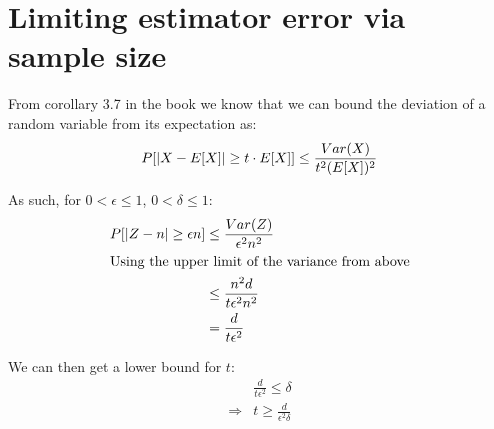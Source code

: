 \documentclass[a4paper]{scrreprt}
\DeclarePairedDelimiter\abs{\lvert}{\rvert}
\begin{document}
\section{Limiting estimator error via sample size}

From corollary 3.7 in the book we know that we can bound the deviation of a
random variable from its expectation as:
\[
	P[\abs{X - E[X]} \geq t \cdot E[X]] \leq \frac{Var(X)}{t^2 (E[X])^2}
\]

As such, for $0 < \epsilon \leq 1$, $0 < \delta \leq 1$:
\begin{align*}
	P[\abs{Z - n} \geq \epsilon n] & \leq \frac{Var(Z)}{\epsilon^2 n^2} \\
	\intertext{Using the upper limit of the variance from above}
	& \leq \frac{n^2 d}{t \epsilon^2 n^2} \\
	& = \frac{d}{t \epsilon^2}
\end{align*}

We can then get a lower bound for $t$:
\begin{align*}
	& \frac{d}{t \epsilon^2} \leq \delta \\
	\Rightarrow & t \geq \frac{d}{\epsilon^2 \delta}
\end{align*}
\end{document}
